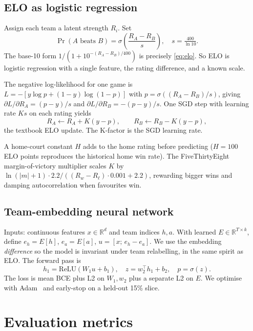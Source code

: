 \documentclass[11pt]{article}
\newcommand{\sigmoid}{\sigma}
\begin{document}
\subsection{ELO as logistic regression}\label{sec:elo}

Assign each team a latent strength $R_i$. Set
\begin{equation}\label{eq:elo}
  \Pr(A \text{ beats } B) = \sigmoid\!\left(\frac{R_A - R_B}{s}\right),
  \quad s = \tfrac{400}{\ln 10}.
\end{equation}
The base-10 form $1 / (1 + 10^{-(R_A - R_B)/400})$ is precisely
\eqref{eq:elo}. So ELO is logistic regression with a single feature,
the rating difference, and a known scale.

The negative log-likelihood for one game is
$L = -[y\log p + (1-y)\log(1-p)]$ with $p = \sigmoid((R_A - R_B)/s)$,
giving $\partial L / \partial R_A = (p - y)/s$ and
$\partial L / \partial R_B = -(p - y)/s$. One SGD step with learning rate
$Ks$ on each rating yields
\begin{equation}\label{eq:eloupdate}
  R_A \leftarrow R_A + K(y - p), \qquad R_B \leftarrow R_B - K(y - p),
\end{equation}
the textbook ELO update. The K-factor is the SGD learning rate.

A home-court constant $H$ adds to the home rating before predicting
($H = 100$ ELO points reproduces the historical home win rate). The
FiveThirtyEight margin-of-victory multiplier scales $K$ by
$\ln(\lvert m\rvert + 1) \cdot 2.2 / ((R_w - R_\ell)\cdot 0.001 + 2.2)$,
rewarding bigger wins and damping autocorrelation when favourites win.

\subsection{Team-embedding neural network}\label{sec:nn}

Inputs: continuous features $x \in \mathbb{R}^d$ and team indices
$h, a$. With learned $E \in \mathbb{R}^{T \times k}$, define $e_h =
E[h]$, $e_a = E[a]$, $u = [x;\, e_h - e_a]$. We use the embedding
\emph{difference} so the model is invariant under team relabelling, in
the same spirit as ELO. The forward pass is
\[
  h_1 = \mathrm{ReLU}(W_1 u + b_1), \quad z = w_2^\top h_1 + b_2,
  \quad p = \sigmoid(z).
\]
The loss is mean BCE plus L2 on $W_1, w_2$ plus a separate L2 on
$E$. We optimise with Adam~\cite{kingma2015adam} and early-stop on a
held-out 15\% slice.

\section{Evaluation metrics}\label{sec:metrics}
\end{document}

